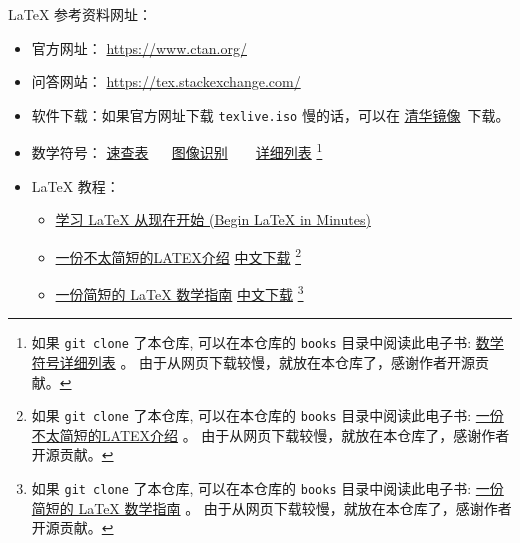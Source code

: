 \documentclass[cn,11pt, simple]{elegantbook}
\begin{document}
\LaTeX{} 参考资料网址：
\begin{itemize}
    \item 官方网址： \href{https://www.ctan.org/}{https://www.ctan.org/}
    \item 问答网站：
        \href{https://tex.stackexchange.com/}{https://tex.stackexchange.com/}
    \item 软件下载：如果官方网址下载 \lstinline{texlive.iso} 慢的话，可以在
    \href{https://mirrors.tuna.tsinghua.edu.cn/CTAN/systems/texlive/Images/}
                {清华镜像}~下载。
    \item 数学符号： \href{books/latex-math-symbols.pdf}{速查表}~ ~
        \href{http://detexify.kirelabs.org/classify.html} {图像识别} ~ ~
        \href{http://mirrors .ustc.edu.cn/CTAN/info/symbols/comprehensive/symbols-a4.pdf}
        {详细列表}
        \footnote{如果 \lstinline{git clone} 了本仓库,
        可以在本仓库的 \lstinline{books}
        目录中阅读此电子书:
        \href{books/symbols-a4.pdf}{数学符号详细列表} 。
        由于从网页下载较慢，就放在本仓库了，感谢作者开源贡献。}
    \item \LaTeX{} 教程：
        \begin{itemize}
            \item \href{h ttps://github.com/luong-komorebi/Begin-Latex-in-minutes/blob/master/Translation-Chinese.md}
                {学习 \LaTeX{} 从现在开始 (Begin \LaTeX{} in Minutes)}
            \item
                \href{https://www.ctan.org/tex-archive/info/lshort/chinese}
                {一份不太简短的LATEX介绍}
        \href{http://mirrors.ctan.org/info/lshort/chinese/lshort-zh-cn.pdf}
                {中文下载}
                \footnote{如果 \lstinline{git clone} 了本仓库,
                可以在本仓库的 \lstinline{books}
                目录中阅读此电子书:
                \href{books/lshort-zh-cn.pdf}{一份不太简短的LATEX介绍} 。
                由于从网页下载较慢，就放在本仓库了，感谢作者开源贡献。}
            \item
                \href{https://www.ctan.org/tex-archive/info/lshort/chinese}
                {一份简短的 LaTeX 数学指南}
                \href{https://wenda.latexstudio.net/article-5006.html}
                {中文下载}
                \footnote{如果 \lstinline{git clone} 了本仓库,
                可以在本仓库的 \lstinline{books}
                目录中阅读此电子书:
                \href{books/short-math-guide(cn).pdf}
                {一份简短的 LaTeX 数学指南} 。
                由于从网页下载较慢，就放在本仓库了，感谢作者开源贡献。}

\end{itemize}
\end{itemize}
\end{document}
